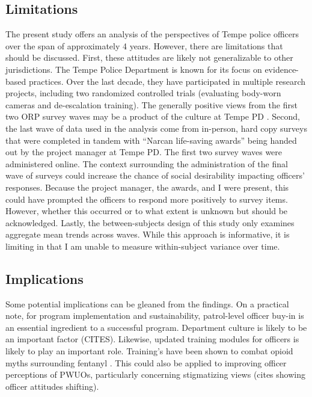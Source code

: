 
\subsection{Limitations}
The present study offers an analysis of the perspectives of Tempe police officers over the span of approximately 4 years. However, there are limitations that should be discussed. First, these attitudes are likely not generalizable to other jurisdictions. The Tempe Police Department is known for its focus on evidence-based practices. Over the last decade, they have participated in multiple research projects, including two randomized controlled trials (evaluating body-worn cameras and de-escalation training). The generally positive views from the first two ORP survey waves may be a product of the culture at Tempe PD \parencite{white_narcan_2021}. Second, the last wave of data used in the analysis come from in-person, hard copy surveys that were completed in tandem with “Narcan life-saving awards” being handed out by the project manager at Tempe PD. The first two survey waves were administered online. The context surrounding the administration of the final wave of surveys could increase the chance of social desirability impacting officers’ responses. Because the project manager, the awards, and I were present, this could have prompted the officers to respond more positively to survey items. However, whether this occurred or to what extent is unknown but should be acknowledged. Lastly, the between-subjects design of this study only examines aggregate mean trends across waves. While this approach is informative, it is limiting in that I am unable to measure within-subject variance over time.

\subsection{Implications}
Some potential implications can be gleaned from the findings. On a practical note, for program implementation and sustainability, patrol-level officer buy-in is an essential ingredient to a successful program. Department culture is likely to be an important factor (CITES). Likewise, updated training modules for officers is likely to play an important role. Training's have been shown to combat opioid myths surrounding fentanyl \parencite{del_pozo_can_2021}. This could also be applied to improving officer perceptions of PWUOs, particularly concerning stigmatizing views (cites showing officer attitudes shifting). 

